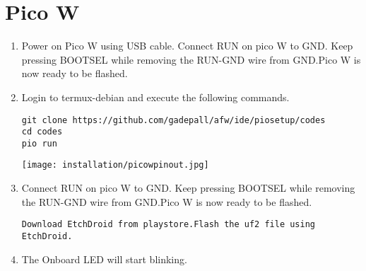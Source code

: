 \documentclass[journal]{IEEEtran}
\begin{document}

\onecolumn

\newpage
\onecolumn


\iffalse
\renewcommand{\thefigure}{\theenumi}
\renewcommand{\thetable}{\theenumi}
\renewcommand{\theequation}{\theenumi}
\fi
\section{Pico W}
\begin{enumerate}[label=\arabic*.,ref=\theenumi]

\item Power on Pico W using USB cable. Connect RUN on pico W to GND. Keep pressing BOOTSEL while removing the RUN-GND wire from GND.Pico W is now ready to be flashed.
\item Login to termux-debian and execute the following commands.
\begin{lstlisting}
git clone https://github.com/gadepall/afw/ide/piosetup/codes
cd codes
pio run
\end{lstlisting}
\begin{center}
    \texttt{[image: installation/picowpinout.jpg]}
    \vspace{0.5em} %
\end{center}
\vspace{0.5em} %
\item Connect RUN on pico W to GND. Keep pressing BOOTSEL while removing the RUN-GND wire from GND.Pico W is now ready to be flashed.
\begin{lstlisting}
Download EtchDroid from playstore.Flash the uf2 file using EtchDroid.
\end{lstlisting}
\vspace{0.5em} %
\item The Onboard LED will start blinking.
\end{enumerate}
\end{document}
